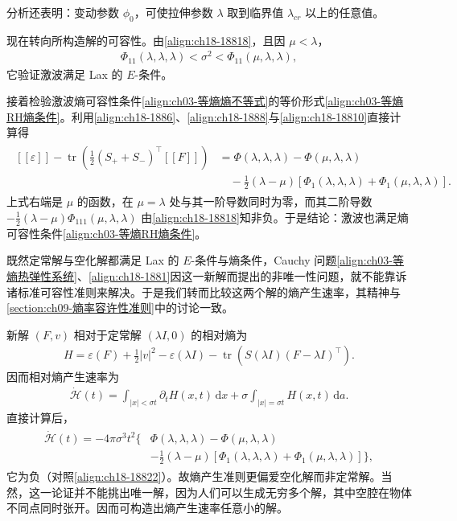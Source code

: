 \documentclass[../../main.tex]{subfiles}
\begin{document}
分析还表明：变动参数 $\phi_0$，可使拉伸参数 $\lambda$ 取到临界值 $\lambda_{cr}$ 以上的任意值。

现在转向所构造解的可容性。由\eqref{align:ch18-18818}，且因 $\mu<\lambda$，
\begin{align}
\Phi_{11}(\lambda,\lambda,\lambda)<\sigma^2<\Phi_{11}(\mu,\lambda,\lambda),
\label{align:ch18-18821}
\end{align}
它验证激波满足 Lax 的 $E$-条件。

接着检验激波熵可容性条件\eqref{align:ch03-等熵熵不等式}的等价形式\eqref{align:ch03-等熵RH熵条件}。利用\eqref{align:ch18-1886}、\eqref{align:ch18-1888}与\eqref{align:ch18-18810}直接计算得
\begin{align}
\begin{aligned}
[\![\varepsilon]\!]-\operatorname{tr}\left(\frac12(S_++S_-)^\top[\![F]\!]\right)
&=\Phi(\lambda,\lambda,\lambda)-\Phi(\mu,\lambda,\lambda)\\
&\quad-\frac12(\lambda-\mu)[\Phi_1(\lambda,\lambda,\lambda)+\Phi_1(\mu,\lambda,\lambda)].
\end{aligned}
\label{align:ch18-18822}
\end{align}
上式右端是 $\mu$ 的函数，在 $\mu=\lambda$ 处与其一阶导数同时为零，而其二阶导数 $-\frac12(\lambda-\mu)\Phi_{111}(\mu,\lambda,\lambda)$ 由\eqref{align:ch18-18818}知非负。于是结论：激波也满足熵可容性条件\eqref{align:ch03-等熵RH熵条件}。

既然定常解与空化解都满足 Lax 的 $E$-条件与熵条件，Cauchy 问题\eqref{align:ch03-等熵热弹性系统}、\eqref{align:ch18-1881}因这一新解而提出的非唯一性问题，就不能靠诉诸标准可容性准则来解决。于是我们转而比较这两个解的熵产生速率，其精神与\cref{section:ch09-熵率容许性准则}中的讨论一致。

新解 $(F,v)$ 相对于定常解 $(\lambda I,0)$ 的相对熵为
\begin{align}
H=\varepsilon(F)+\frac12|v|^2-\varepsilon(\lambda I)-\operatorname{tr}\left(S(\lambda I)(F-\lambda I)^\top\right).
\label{align:ch18-18823}
\end{align}
因而相对熵产生速率为
\begin{align}
\dot{\mathscr H}(t)=\int_{|x|<\sigma t}\partial_t H(x,t)\,\mathrm{d}x+\sigma\int_{|x|=\sigma t}H(x,t)\,\mathrm{d}a.
\label{align:ch18-18824}
\end{align}
直接计算后，
\begin{align}
\begin{aligned}
\dot{\mathscr H}(t)=-4\pi\sigma^3t^2\bigl\{&\Phi(\lambda,\lambda,\lambda)-\Phi(\mu,\lambda,\lambda)\\
&-\frac12(\lambda-\mu)[\Phi_1(\lambda,\lambda,\lambda)+\Phi_1(\mu,\lambda,\lambda)]\bigr\},
\end{aligned}
\label{align:ch18-18825}
\end{align}
它为负（对照\eqref{align:ch18-18822}）。故熵产生准则更偏爱空化解而非定常解。当然，这一论证并不能挑出唯一解，因为人们可以生成无穷多个解，其中空腔在物体不同点同时张开。因而可构造出熵产生速率任意小的解。
\end{document}
